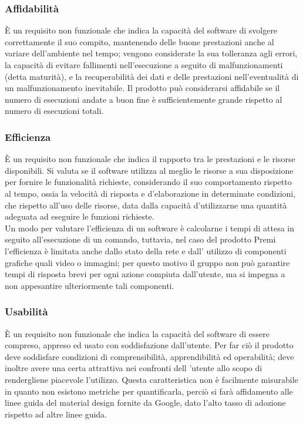 \subsubsection{Affidabilità}
È un requisito non funzionale che indica la capacità del software di svolgere correttamente il suo compito, mantenendo delle buone prestazioni anche al variare dell'ambiente nel tempo; vengono considerate la sua tolleranza agli errori, la capacità di evitare fallimenti nell’esecuzione a seguito di malfunzionamenti
(detta maturità), e la recuperabilità dei dati e delle prestazioni nell'eventualità di un malfunzionamento inevitabile. Il prodotto può considerarsi affidabile se il numero di esecuzioni andate a buon fine è sufficientemente grande rispetto al numero di esecuzioni totali.

\subsubsection{Efficienza}
È un requisito non funzionale che indica il rapporto tra le prestazioni e le risorse disponibili.
Si valuta se il software utilizza al meglio le risorse a sua disposizione per fornire le funzionalità richieste, considerando il suo comportamento rispetto al tempo, ossia la velocità di risposta e d'elaborazione in determinate condizioni, che rispetto all’uso delle risorse, data dalla capacità d'utilizzarne una quantità adeguata ad eseguire le funzioni richieste. \\
Un modo per valutare l’efficienza di un software è calcolarne i tempi di attesa in seguito all’esecuzione di un comando, tuttavia, nel caso del prodotto Premi l'efficienza è limitata anche dallo stato della rete e dall' utilizzo di componenti grafiche quali video o immagini; per questo motivo il gruppo non può garantire tempi di risposta brevi per ogni azione compiuta dall’utente, ma si impegna a non appesantire ulteriormente tali componenti.

\subsubsection{Usabilità}
È un requisito non funzionale che indica la capacità del software di essere compreso, appreso ed usato con soddisfazione dall'utente.
Per far ciò il prodotto deve soddisfare condizioni di comprensibilità, apprendibilità ed operabilità; deve inoltre avere una certa attrattiva nei confronti dell 'utente allo scopo di rendergliene piacevole l’utilizzo. Questa caratteristica non è facilmente misurabile in quanto non esistono metriche per quantificarla, perciò si farà affidamento alle linee guida del material design fornite da Google, dato l'alto tasso di adozione rispetto ad altre linee guida.

